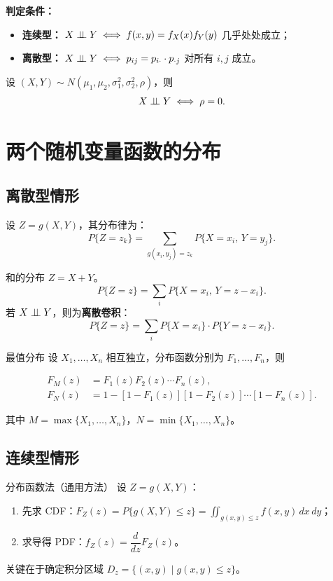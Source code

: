 \textbf{判定条件：}
\begin{itemize}
	\item \textbf{连续型：} $X \perp\!\!\!\perp Y \iff f(x, y) = f_X(x) f_Y(y)$ 几乎处处成立；
	\item \textbf{离散型：} $X \perp\!\!\!\perp Y \iff p_{ij} = p_{i\cdot} \cdot p_{\cdot j}$ 对所有 $i, j$ 成立。
\end{itemize}

\begin{theorem}[二维正态分布的独立性]
设 $(X, Y) \sim N(\mu_1, \mu_2, \sigma_1^2, \sigma_2^2, \rho)$，则
\[X \perp\!\!\!\perp Y \iff \rho = 0.\]
\end{theorem}

\section{两个随机变量函数的分布}

\subsection{离散型情形}

设 $Z = g(X, Y)$，其分布律为：
\[P\{Z = z_k\} = \sum_{g(x_i, y_j) = z_k} P\{X = x_i,\, Y = y_j\}.\]

\begin{myTheorem}{和的分布}
$Z = X + Y$。
\[P\{Z = z\} = \sum_i P\{X = x_i,\, Y = z - x_i\}.\]
若 $X \perp\!\!\!\perp Y$，则为\textbf{离散卷积}：
\[P\{Z = z\} = \sum_i P\{X = x_i\} \cdot P\{Y = z - x_i\}.\]
\end{myTheorem}

\begin{myTheorem}{最值分布}
设 $X_1, \ldots, X_n$ 相互独立，分布函数分别为 $F_1, \ldots, F_n$，则
\begin{myformula}
\[
\begin{aligned}
    F_M(z) &= F_1(z) F_2(z) \cdots F_n(z), \\
    F_N(z) &= 1 - [1 - F_1(z)] [1 - F_2(z)] \cdots [1 - F_n(z)].
\end{aligned}
\]
\end{myformula}
其中 $M = \max\{X_1, \ldots, X_n\}$，$N = \min\{X_1, \ldots, X_n\}$。
\end{myTheorem}

\subsection{连续型情形}

\begin{myTheorem}{分布函数法（通用方法）}
设 $Z = g(X, Y)$：
\begin{enumerate}
	\item 先求 CDF：$\displaystyle F_Z(z) = P\{g(X, Y) \leq z\} = \iint_{g(x, y) \leq z} f(x, y)\,dx\,dy$；
	\item 求导得 PDF：$f_Z(z) = \dfrac{d}{dz} F_Z(z)$。
\end{enumerate}
关键在于确定积分区域 $D_z = \{(x, y) \mid g(x, y) \leq z\}$。
\end{myTheorem}

